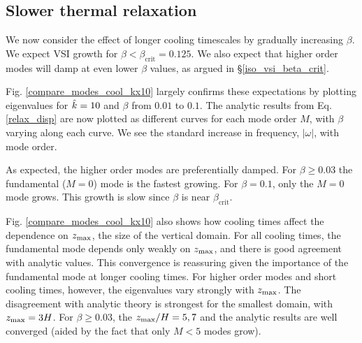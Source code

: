 \subsection{Slower thermal relaxation}\label{therm_relax_eff}
We now consider the effect of longer cooling timescales by gradually
increasing  
$\beta$. We expect VSI growth for  $\beta < \beta_\mathrm{crit} =
0.125$.  We also expect that higher order modes will damp at even
lower $\beta$ values, as argued in \S\ref{iso_vsi_beta_crit}. 

Fig. \ref{compare_modes_cool_kx10} largely confirms these expectations
by plotting eigenvalues for $\hat{k}=10$  
and $\beta$ from $0.01$ to  $0.1$.  
The analytic results from Eq. \ref{relax_disp} are now plotted as
different curves for each mode order $M$, with $\beta$ varying along
each curve. We see the standard increase in frequency, $|\omega|$,
with mode order. 

As expected, the higher order modes are preferentially damped.  For
$\beta \geq 0.03$ the fundamental ($M = 0$) mode is the fastest
growing. For $\beta = 0.1$, only the $M = 0$ mode grows. This growth
is slow since $\beta$ is near $\beta_\mathrm{crit}$. 

Fig. \ref{compare_modes_cool_kx10} also shows how cooling times affect
the dependence on $z_\mathrm{max}$, the size of the vertical domain.   For all
cooling times, the fundamental mode depends only weakly on $z_\mathrm{max}$,
and there is good agreement with analytic values.  This convergence is
reassuring given the importance of the fundamental mode at longer
cooling times.  For higher order modes and short cooling times,
however, the eigenvalues vary strongly with $z_\mathrm{max}$.  The disagreement
with analytic theory is strongest for the smallest domain, with $z_\mathrm{max}
= 3 H$.  For $\beta \geq 0.03$, the $z_\mathrm{max}/H = 5, 7$ and the analytic
results are well converged (aided by the fact that only $M < 5$ modes
grow). 


%

